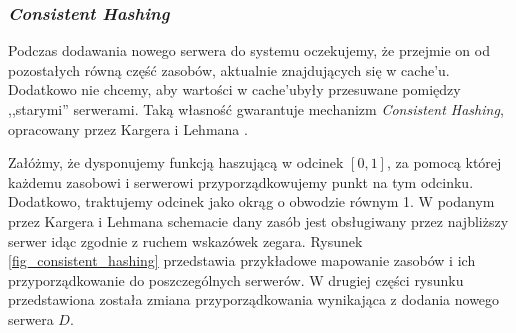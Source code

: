 \documentclass[a4paper,11pt]{scrartcl}
\newcommand{\keszu}{cache'u}
\begin{document}
\subsubsection{\textit{Consistent Hashing}}
Podczas dodawania nowego serwera do systemu oczekujemy, że przejmie on od pozostałych równą część zasobów, aktualnie znajdujących się w \keszu. Dodatkowo nie chcemy, aby wartości w \keszu były przesuwane pomiędzy ,,starymi'' serwerami. Taką własność gwarantuje mechanizm \textit{Consistent Hashing}, opracowany przez Kargera i Lehmana \cite{karger1997consistent}.

Załóżmy, że dysponujemy funkcją haszującą w odcinek $[0, 1]$, za pomocą której każdemu zasobowi i serwerowi przyporządkowujemy punkt na tym odcinku. Dodatkowo, traktujemy odcinek jako okrąg o obwodzie równym 1. W podanym przez Kargera i Lehmana schemacie dany zasób jest obsługiwany przez najbliższy serwer idąc zgodnie z ruchem wskazówek zegara. Rysunek \ref{fig_consistent_hashing} przedstawia przykładowe mapowanie zasobów i ich przyporządkowanie do poszczególnych serwerów. W drugiej części rysunku przedstawiona została zmiana przyporządkowania wynikająca z dodania nowego serwera $D$.
\end{document}
